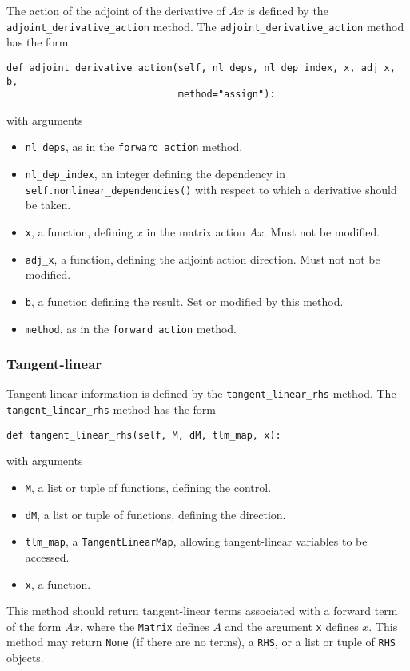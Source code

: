 \documentclass[11pt]{article}
\begin{document}
The action of the adjoint of the derivative of $A x$ is defined by the
\texttt{adjoint\_derivative\_action} method. The
\texttt{adjoint\_derivative\_action} method has the form
\begin{lstlisting}
def adjoint_derivative_action(self, nl_deps, nl_dep_index, x, adj_x, b,
                              method="assign"):
\end{lstlisting}
with arguments
\begin{itemize}
  \item \texttt{nl\_deps}, as in the \texttt{forward\_action} method.
  \item \texttt{nl\_dep\_index}, an integer defining the dependency in
    \texttt{self.nonlinear\_dependencies()} with respect to which a derivative
    should be taken.
  \item \texttt{x}, a function, defining $x$ in the matrix action $A x$. Must
    not be modified.
  \item \texttt{adj\_x}, a function, defining the adjoint action direction.
    Must not not be modified.
  \item \texttt{b}, a function defining the result. Set or modified by this
    method.
  \item \texttt{method}, as in the \texttt{forward\_action} method.
\end{itemize}

\subsubsection{Tangent-linear}

Tangent-linear information is defined by the \texttt{tangent\_linear\_rhs}
method. The \texttt{tangent\_linear\_rhs} method has the form
\begin{lstlisting}
def tangent_linear_rhs(self, M, dM, tlm_map, x):
\end{lstlisting}
with arguments
\begin{itemize}
  \item \texttt{M}, a list or tuple of functions, defining the control.
  \item \texttt{dM}, a list or tuple of functions, defining the direction.
  \item \texttt{tlm\_map}, a \texttt{TangentLinearMap}, allowing tangent-linear
    variables to be accessed.
  \item \texttt{x}, a function.
\end{itemize}
This method should return tangent-linear terms associated with a forward term
of the form $A x$, where the \texttt{Matrix} defines $A$ and the argument
\texttt{x} defines $x$. This method may return \texttt{None} (if there are no
terms), a \texttt{RHS}, or a list or tuple of \texttt{RHS} objects.
\end{document}
